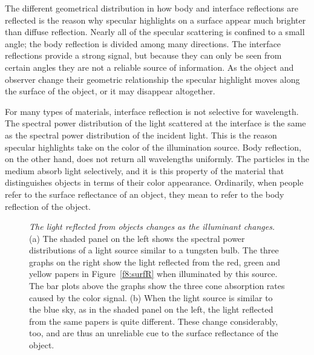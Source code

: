 The different geometrical distribution in how body and interface
reflections are reflected is the reason why specular highlights on a
surface appear much brighter than diffuse reflection.  Nearly all of
the specular scattering is confined to a small angle; the body
reflection is divided among many directions.  The interface
reflections provide a strong signal, but because they can only be seen
from certain angles they are not a reliable source of information.  As
the object and observer change their geometric relationship the
specular highlight moves along the surface of the object, or it may
disappear altogether.

For many types of materials, interface reflection is not selective for
wavelength.  The spectral power distribution of the light scattered at
the interface is the same as the spectral power distribution of the
incident light.  This is the reason specular highlights take on the
color of the illumination source.  Body reflection, on the other hand,
does not return all wavelengths uniformly.  The particles in the
medium absorb light selectively, and it is this property of the
material that distinguishes objects in terms of their color
appearance.  Ordinarily, when people refer to the surface reflectance
of an object, they mean to refer to the body reflection of the object.

\begin{figure}
\centerline{
}
\caption[The Color Signal Under Two Illuminants]{
{\em The light reflected from objects changes as the illuminant
changes.}  (a) The shaded panel on the left shows the spectral power
distributions of a light source similar to a tungsten bulb.  The
three graphs on the right show the light reflected from the red, green
and yellow papers in Figure~\ref{f8:surfR} when illuminated by this
source. The bar plots above the graphs show the three cone absorption
rates caused by the color signal.  (b) When the light source is
similar to the blue sky, as in the shaded panel on the left, the light
reflected from the same papers is quite different.  These change
considerably, too, and are thus an unreliable cue to the surface
reflectance of the object.  }
\label{f8:colorSig}
\end{figure}


